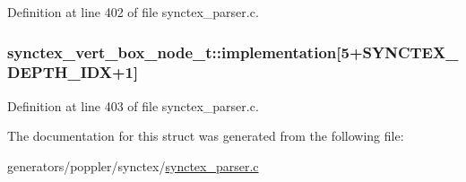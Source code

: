 Definition at line 402 of file synctex\+\_\+parser.\+c.

\hypertarget{structsynctex__vert__box__node__t_a35dfef7dc54c9ce718e2c97dce5b673b}{
\subsubsection[{implementation}]{ synctex\+\_\+vert\+\_\+box\+\_\+node\+\_\+t\+::implementation\mbox{[}5+{\bf S\+Y\+N\+C\+T\+E\+X\+\_\+\+D\+E\+P\+T\+H\+\_\+\+I\+D\+X}+1\mbox{]}}}\label{structsynctex__vert__box__node__t_a35dfef7dc54c9ce718e2c97dce5b673b}


Definition at line 403 of file synctex\+\_\+parser.\+c.



The documentation for this struct was generated from the following file\+:\begin{DoxyCompactItemize}
\item 
generators/poppler/synctex/\hyperlink{synctex__parser_8c}{synctex\+\_\+parser.\+c}\end{DoxyCompactItemize}
